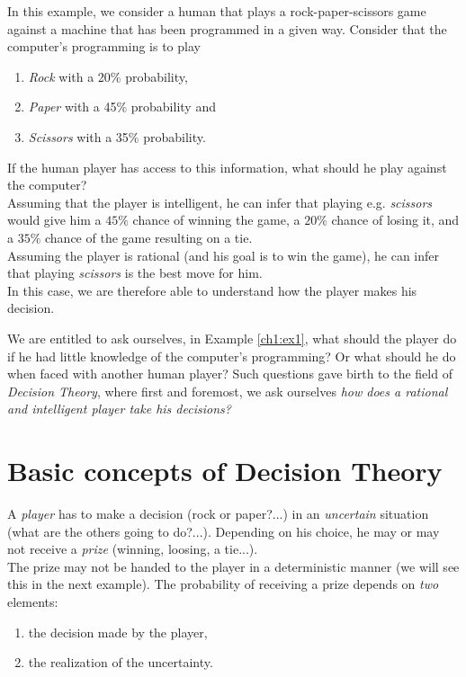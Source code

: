 \begin{example}
\label{ch1:ex1}
In this example, we consider a human that plays a rock-paper-scissors game against a machine that has been programmed in a given way.
Consider that the computer's programming is to play
\begin{enumerate}
\item \emph{Rock} with a 20\% probability,
\item \emph{Paper} with a 45\% probability and
\item \emph{Scissors} with a 35\% probability.
\end{enumerate}
If the human player has access to this information, what should he play against the computer?\\
Assuming that the player is intelligent, he can infer that playing e.g. \emph{scissors} would give him a $45\%$ chance of winning the game, a $20\%$ chance of losing it, and a $35\%$ chance of the game resulting on a tie.\\
Assuming the player is rational (and his goal is to win the game), he can infer that playing \emph{scissors} is the best move for him. \\
In this case, we are therefore able to understand how the player makes his decision.
\end{example}

We are entitled to ask ourselves, in Example \ref{ch1:ex1}, what should the player do if he had little knowledge of the computer's programming? Or what should he do when faced with another human player? Such questions gave birth to the field of \emph{Decision Theory}, where first and foremost, we ask ourselves \emph{how does a rational and intelligent player take his decisions?}





\section{Basic concepts of Decision Theory}


A \emph{player} has to make a decision (rock or paper?...) in an \emph{uncertain} situation (what are the others going to do?...). Depending on his choice, he may or may not receive a  \emph{prize} (winning, loosing, a tie...). \\
The prize may not be handed to the player in a deterministic manner (we will see this in the next example). The probability of receiving a prize depends on \emph{two} elements:
\begin{enumerate}
\item the decision made by the player,
\item the realization of the uncertainty.
\end{enumerate}

